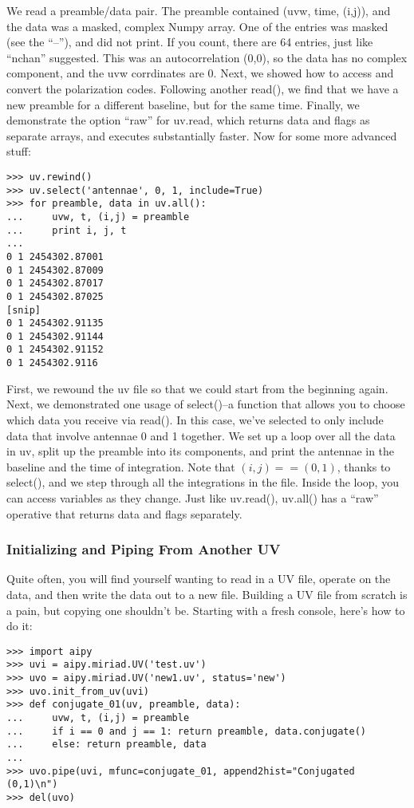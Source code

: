 We read a preamble/data pair.  The preamble contained (uvw, time, (i,j)), and
the data was a masked, complex Numpy array.  One of the entries was
masked (see the ``--''), and did not print.  If you count, there are 64
entries, just like ``nchan'' suggested.  This was an
autocorrelation (0,0), so the data has no complex component, and the uvw
corrdinates are 0.  Next, we showed how to access and convert the polarization
codes.  Following another read(), we find that we have a new preamble for
a different baseline, but for the same time.  Finally, we demonstrate the
option ``raw'' for uv.read, which returns data and flags as separate arrays,
and executes substantially faster.  Now for some more advanced stuff:

\begin{verbatim}
>>> uv.rewind()
>>> uv.select('antennae', 0, 1, include=True)
>>> for preamble, data in uv.all():
...     uvw, t, (i,j) = preamble
...     print i, j, t
...
0 1 2454302.87001
0 1 2454302.87009
0 1 2454302.87017
0 1 2454302.87025
[snip]
0 1 2454302.91135
0 1 2454302.91144
0 1 2454302.91152
0 1 2454302.9116
\end{verbatim}

First, we rewound the uv file so that we could start from the beginning again.
Next, we demonstrated one usage of select()--a function that allows you to 
choose which data you receive via read().  In this case, we've selected 
to only include data
that involve antennae 0 and 1 together.  We set up a loop over all the
data in uv, split up the preamble into its components, and print the antennae
in the baseline and the time of integration.  Note that $(i,j) == (0,1)$, 
thanks to select(), and we step through all the integrations in the file.
Inside the loop, you can access variables as they change.  Just like 
uv.read(), uv.all() has a ``raw'' operative that returns data and flags
separately. 

\subsubsection{Initializing and Piping From Another UV}

Quite often, you will find yourself wanting to read in a UV file, operate
on the data, and then write the data out to a new file.  Building a UV file
from scratch is a pain, but copying one shouldn't be.  Starting with a fresh
console, here's how to do it:

\begin{verbatim}
>>> import aipy
>>> uvi = aipy.miriad.UV('test.uv')
>>> uvo = aipy.miriad.UV('new1.uv', status='new')
>>> uvo.init_from_uv(uvi)
>>> def conjugate_01(uv, preamble, data):
...     uvw, t, (i,j) = preamble
...     if i == 0 and j == 1: return preamble, data.conjugate()
...     else: return preamble, data
...
>>> uvo.pipe(uvi, mfunc=conjugate_01, append2hist="Conjugated (0,1)\n")
>>> del(uvo)
\end{verbatim}

